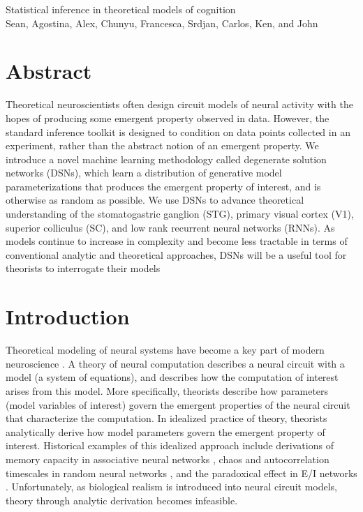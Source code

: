 \documentclass[11pt]{article}
\begin{document}
\medskip                        %

\thispagestyle{plain}
{\Large Statistical inference in theoretical models of cognition} \\
Sean, Agostina, Alex, Chunyu, Francesca, Srdjan, Carlos, Ken, and John
\section{Abstract}
Theoretical neuroscientists often design circuit models of neural activity with the hopes of producing some emergent property observed in data.  However, the standard inference toolkit is designed to condition on data points collected in an experiment, rather than the abstract notion of an emergent property.  We introduce a novel machine learning methodology called degenerate solution networks (DSNs), which learn a distribution of generative model parameterizations that produces the emergent property of interest, and is otherwise as random as possible.  We use DSNs to advance theoretical understanding of the stomatogastric ganglion (STG), primary visual cortex (V1), superior colliculus (SC), and low rank recurrent neural networks (RNNs).  As models continue to increase in complexity and become less tractable in terms of conventional analytic and theoretical approaches, DSNs will be a useful tool for theorists to interrogate their models

\section{Introduction}
Theoretical modeling of neural systems have become a key part of modern neuroscience \cite{abbott2008theoretical}. A theory of neural computation describes a neural circuit with a model (a system of equations), and describes how the computation of interest arises from this model.  More specifically, theorists describe how parameters (model variables of interest) govern the emergent properties of the neural circuit that characterize the computation.  In idealized practice of theory, theorists analytically derive how model parameters govern the emergent property of interest.  Historical examples of this idealized approach include derivations of memory capacity in associative neural networks  \cite{hopfield1984neurons}, chaos and autocorrelation timescales in random neural networks \cite{sompolinsky1988chaos}, and the paradoxical effect in E/I networks \cite{tsodyks1997paradoxical}.  Unfortunately, as biological realism is introduced into neural circuit models, theory through analytic derivation becomes infeasible.
\end{document}
